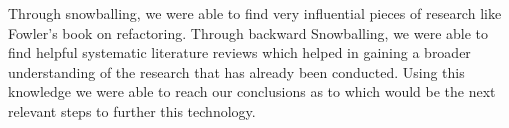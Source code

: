 Through snowballing, we were able to find very influential pieces of research like Fowler's book on refactoring. \cite{fowler2018refactoring}
Through backward Snowballing, we were able to find helpful systematic literature reviews which helped in gaining a broader understanding of the research that has already been conducted. \cite{mariani2017systematic} \cite{baqais2020automatic} \cite{7833023}
Using this knowledge we were able to reach our conclusions as to which would be the next relevant steps to further this technology.